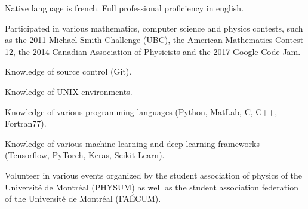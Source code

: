 \begin{cvletter}
{
  \begin{cvitems}
    \item {Native language is french. Full professional proficiency in english.}
    \item{Participated in various mathematics, computer science and physics contests, such as the 2011 Michael Smith Challenge (UBC), the American Mathematics Contest 12, the 2014 Canadian Association of Physicists and the 2017 Google Code Jam.}
    \item{Knowledge of source control (Git).}
    \item{Knowledge of UNIX environments.}
    \item{Knowledge of various programming languages (Python, MatLab, C, C++, Fortran77).}
    \item{Knowledge of various machine learning and deep learning frameworks (Tensorflow, PyTorch, Keras, Scikit-Learn).}
    \item{Volunteer in various events organized by the student association of physics of the Universit\'e de Montr\'eal (PHYSUM) as well as the student association federation of the Universit\'e de Montr\'eal (FA\'ECUM).}
  \end{cvitems}
 }
\end{cvletter}

